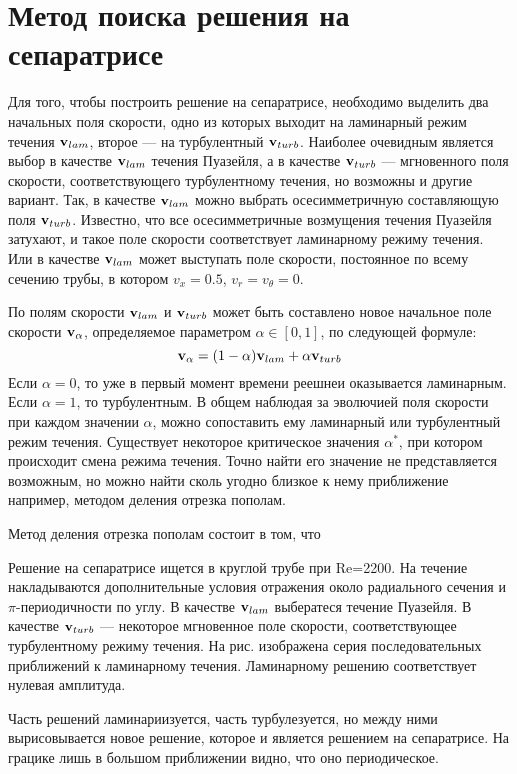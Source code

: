 \section{Метод поиска решения на сепаратрисе}


Для того, чтобы построить решение на сепаратрисе, необходимо выделить два начальных поля скорости, одно из которых выходит на ламинарный режим течения $\mathbf{v}_{lam}$, второе --- на турбулентный $\mathbf{v}_{turb}$. Наиболее очевидным является выбор в качестве $\mathbf{v}_{lam}$ течения Пуазейля, а в качестве $\mathbf{v}_{turb}$ --- мгновенного поля скорости, соответствующего турбулентному течения, но возможны и другие вариант. Так, в качестве $\mathbf{v}_{lam}$ можно выбрать осесимметричную составляющую поля $\mathbf{v}_{turb}$.  Известно, что все осесимметричные возмущения течения Пуазейля затухают, и такое поле скорости соответствует ламинарному режиму течения. Или в качестве $\mathbf{v}_{lam}$ может выступать поле скорости, постоянное по всему сечению трубы, в котором $v_x = 0.5$, $v_r = v_\theta = 0$. 


По полям скорости $\mathbf{v}_{lam}$ и $\mathbf{v}_{turb}$ может быть составлено новое начальное поле скорости $\mathbf{v}_{\alpha}$, определяемое параметром $\alpha \in [0,1]$, по следующей формуле:
\begin{equation}
\mathbf{v}_{\alpha} = (1 - \alpha)\mathbf{v}_{lam} + \alpha \mathbf{v}_{turb}
\end{equation}
Если $\alpha = 0$, то уже в первый момент времени реешнеи оказывается ламинарным. Если $\alpha = 1$, то турбулентным. В общем наблюдая за эволючией поля скорости при каждом значении $\alpha$, можно сопоставить ему ламинарный или турбулентный режим течения. Существует некоторое критическое значения $\alpha^*$, при котором происходит смена режима течения. Точно найти его значение не представляется возможным, но можно найти сколь угодно близкое к нему приближение например, методом деления отрезка пополам. 


Метод деления отрезка пополам состоит в том, что 



Решение на сепаратрисе ищется в круглой трубе при Re=2200. На течение накладываются дополнительные условия отражения около радиального сечения и $\pi$-периодичности по углу. В качестве $\mathbf{v}_{lam}$ выбератеся течение Пуазейля. В качестве $\mathbf{v}_{turb}$ --- некоторое мгновенное поле скорости, соответствующее турбулентному режиму течения. На рис. изображена серия последовательных приближений к ламинарному течения. Ламинарному решению соответствует нулевая амплитуда. 

Часть решений ламинариизуется, часть турбулезуется, но между ними вырисовывается новое решение, которое и является решением на сепаратрисе. На грацике лишь в большом приближении видно, что оно периодическое. 



